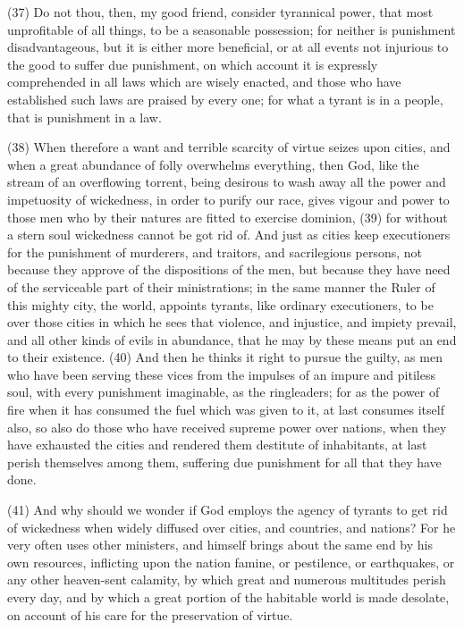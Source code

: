 (37) Do not thou, then, my good friend, consider tyrannical power, that most unprofitable of all
things, to be a seasonable possession; for neither is punishment disadvantageous, but it is either
more beneficial, or at all events not injurious to the good to suffer due punishment, on which
account it is expressly comprehended in all laws which are wisely enacted, and those who have
established such laws are praised by every one; for what a tyrant is in a people, that is punishment
in a law.

(38) When therefore a want and terrible scarcity of virtue seizes upon cities, and when a great
abundance of folly overwhelms everything, then God, like the stream of an overflowing torrent,
being desirous to wash away all the power and impetuosity of wickedness, in order to purify our
race, gives vigour and power to those men who by their natures are fitted to exercise dominion,
(39) for without a stern soul wickedness cannot be got rid of. And just as cities keep executioners
for the punishment of murderers, and traitors, and sacrilegious persons, not because they approve
of the dispositions of the men, but because they have need of the serviceable part of their
ministrations; in the same manner the Ruler of this mighty city, the world, appoints tyrants, like
ordinary executioners, to be over those cities in which he sees that violence, and injustice, and
impiety prevail, and all other kinds of evils in abundance, that he may by these means put an end to
their existence. (40) And then he thinks it right to pursue the guilty, as men who have been serving
these vices from the impulses of an impure and pitiless soul, with every punishment imaginable, as
the ringleaders; for as the power of fire when it has consumed the fuel which was given to it, at last
consumes itself also, so also do those who have received supreme power over nations, when they
have exhausted the cities and rendered them destitute of inhabitants, at last perish themselves
among them, suffering due punishment for all that they have done.

(41) And why should we wonder if God employs the agency of tyrants to get rid of wickedness
when widely diffused over cities, and countries, and nations? For he very often uses other
ministers, and himself brings about the same end by his own resources, inflicting upon the nation
famine, or pestilence, or earthquakes, or any other heaven-sent calamity, by which great and
numerous multitudes perish every day, and by which a great portion of the habitable world is made
desolate, on account of his care for the preservation of virtue.

